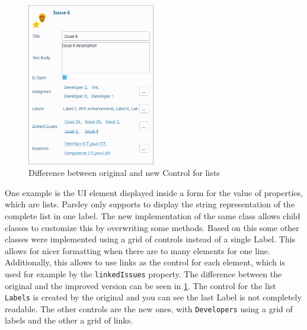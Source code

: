 \begin{figure}[!h]
	\centering
	\includegraphics[width=0.5\textwidth]{graphics/screenshot_improvement_fromControl.png}
	\caption{Difference between original and new Control for lists}
	\label{fig:c4:screenshot_improvement_formControl}
\end{figure}
One example is the \gls{UI} element displayed inside a form for the value of properties, which are lists.
Parsley only supports to display the string representation of the complete list in one label.
The new implementation of the same class allows child classes to customize this by overwriting some methods.
Based on this some other classes were implemented using a grid of controls instead of a single Label.
This allows for nicer formatting when there are to many elements for one line.
Additionally, this allows to use links as the control for each element, which is used for example by the \lstinline|linkedIssues| property.
The difference between the original and the improved version can be seen in \cref{fig:c4:screenshot_improvement_formControl}.
The control for the list \lstinline|Labels| is created by the original and you can see the last Label is not completely readable.
The other controls are the new ones, with \lstinline|Developers| using a grid of labels and the other a grid of links.

